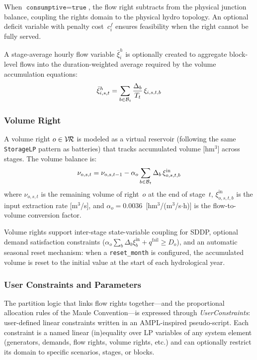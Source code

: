 When $\texttt{consumptive} = \texttt{true}$, the flow right subtracts
from the physical junction balance, coupling the rights domain to the
physical hydro topology.  An optional deficit variable with penalty
cost~$c_i^f$ ensures feasibility when the right cannot be fully served.

A stage-average hourly flow variable $\bar{\xi}^h_i$ is optionally
created to aggregate block-level flows into the duration-weighted
average required by the volume accumulation equations:
\begin{equation}
\label{eq:fr_avg}
\bar{\xi}^h_{i,s,t} = \sum_{b \in \mathcal{B}_t}
  \frac{\Delta_b}{T_t} \, \xi_{i,s,t,b}
\end{equation}

\subsubsection{Volume Right}

A volume right $o \in \mathcal{V\!R}$ is modeled as a virtual reservoir
(following the same \texttt{StorageLP} pattern as batteries) that
tracks accumulated volume [hm$^3$] across stages.  The volume balance
is:
\begin{equation}
\label{eq:vr_balance}
\nu_{o,s,t} = \nu_{o,s,t-1}
  - \alpha_o \sum_{b \in \mathcal{B}_t} \Delta_b \, \xi^\text{in}_{o,s,t,b}
\end{equation}
where $\nu_{o,s,t}$ is the remaining volume of right~$o$ at the end of
stage~$t$, $\xi^\text{in}_{o,s,t,b}$ is the input extraction rate
[m$^3$/s], and $\alpha_o = 0.0036$~[hm$^3$/(m$^3$/s$\cdot$h)] is the
flow-to-volume conversion factor.

Volume rights support inter-stage state-variable coupling for SDDP,
optional demand satisfaction constraints
($\alpha_o \sum_b \Delta_b \xi^\text{in}_b + q^\text{fail} \geq D_o$),
and an automatic seasonal reset mechanism: when a
\texttt{reset\_month} is configured, the accumulated volume is reset to
the initial value at the start of each hydrological year.

\subsubsection{User Constraints and Parameters}
\label{sec:user_constraints}

The partition logic that links flow rights together---and the
proportional allocation rules of the Maule Convention---is expressed
through \emph{UserConstraints}: user-defined linear constraints written
in an AMPL-inspired pseudo-script.  Each constraint is a named linear
(in)equality over LP variables of any system element (generators,
demands, flow rights, volume rights, etc.) and can optionally restrict
its domain to specific scenarios, stages, or blocks.

